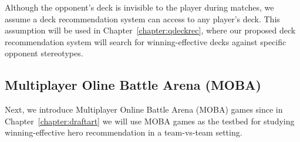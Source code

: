 Although the opponent's deck is invisible to the player during matches, we assume a deck recommendation system can access to any player's deck. This assumption will be used in Chapter~\ref{chapter:qdeckrec}, where our proposed deck recommendation system will search for winning-effective decks against specific opponent stereotypes. 




\subsection{Multiplayer Oline Battle Arena (MOBA)}
Next, we introduce Multiplayer Online Battle Arena (MOBA) games since in Chapter~\ref{chapter:draftart} we will use MOBA games as the testbed for studying winning-effective hero recommendation in a team-vs-team setting.

